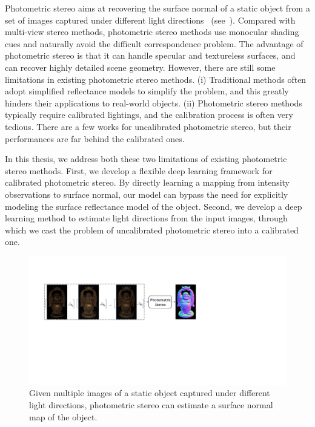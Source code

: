Photometric stereo aims at recovering the surface normal of a static object from a set of images captured under different light directions~\cite{woodham1980ps,silver1980determining} (see~).
Compared with multi-view stereo methods, photometric stereo methods use monocular shading cues and naturally avoid the difficult correspondence problem. 
The advantage of photometric stereo is that it can handle specular and textureless surfaces, and can recover highly detailed scene geometry.
However, there are still some limitations in existing photometric stereo methods. (i) Traditional methods often adopt simplified reflectance models to simplify the problem, and this greatly hinders their applications to real-world objects. (ii) Photometric stereo methods typically require calibrated lightings, and the calibration process is often very tedious. There are a few works for uncalibrated photometric stereo, but their performances are far behind the calibrated ones.

In this thesis, we address both these two limitations of existing photometric stereo methods. 
First, we develop a flexible deep learning framework for calibrated photometric stereo. By directly learning a mapping from intensity observations to surface normal, our model can bypass the need for explicitly modeling the surface reflectance model of the object. 
Second, we develop a deep learning method to estimate light directions from the input images, through which we cast the problem of uncalibrated photometric stereo into a calibrated one.

\begin{figure} \centering
    \includegraphics[width=\textwidth]{ch-introduction/images/Intro_PS}
    \caption[Illustration of photometric stereo]{Given multiple images of a static object captured under different light directions, photometric stereo can estimate a surface normal map of the object.} \label{fig:intro_ps}
\end{figure}



